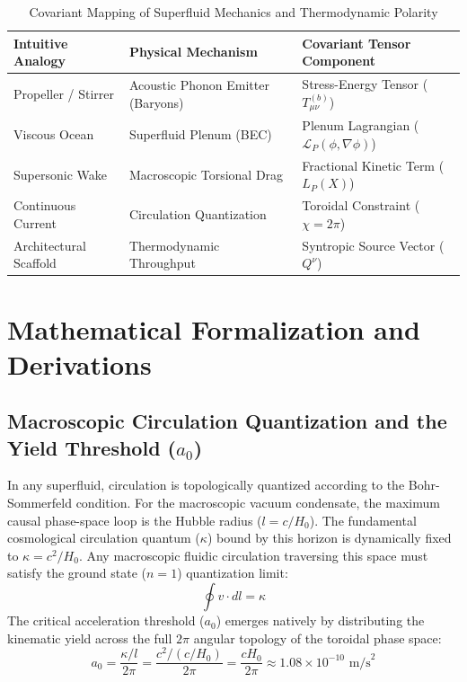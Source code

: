 \documentclass[aps,prd,10pt,twocolumn,superscriptaddress,nofootinbib]{revtex4-2}
\begin{document}
\begin{table}[htbp]
\centering
\caption{\footnotesize Covariant Mapping of Superfluid Mechanics and Thermodynamic Polarity}
\label{tab:covariant}
\begin{tabular}{lll}
\toprule
\textbf{Intuitive Analogy} & \textbf{Physical Mechanism} & \textbf{Covariant Tensor Component} \\
\midrule
Propeller / Stirrer & Acoustic Phonon Emitter (Baryons) & Stress-Energy Tensor ($T_{\mu\nu}^{(b)}$) \\
Viscous Ocean & Superfluid Plenum (BEC) & Plenum Lagrangian ($\mathcal{L}_P(\phi,\nabla\phi)$) \\
Supersonic Wake & Macroscopic Torsional Drag & Fractional Kinetic Term ($L_P(X)$) \\
Continuous Current & Circulation Quantization & Toroidal Constraint ($\chi=2\pi$) \\
Architectural Scaffold & Thermodynamic Throughput & Syntropic Source Vector ($Q^\nu$) \\
\bottomrule
\end{tabular}
\end{table}

\section{\label{sec:math}Mathematical Formalization and Derivations}

\subsection{Macroscopic Circulation Quantization and the Yield Threshold (\texorpdfstring{$a_0$}{a0})}
In any superfluid, circulation is topologically quantized according to the Bohr-Sommerfeld condition. For the macroscopic vacuum condensate, the maximum causal phase-space loop is the Hubble radius ($l = c/H_0$). The fundamental cosmological circulation quantum ($\kappa$) bound by this horizon is dynamically fixed to $\kappa = c^2/H_0$. Any macroscopic fluidic circulation traversing this space must satisfy the ground state ($n=1$) quantization limit:
\begin{equation}
\oint v \cdot dl = \kappa
\end{equation}
The critical acceleration threshold ($a_0$) emerges natively by distributing the kinematic yield across the full $2\pi$ angular topology of the toroidal phase space:
\begin{equation}
a_0 = \frac{\kappa / l}{2\pi} = \frac{c^2 / (c/H_0)}{2\pi} = \frac{c H_0}{2\pi} \approx 1.08 \times 10^{-10} \text{ m/s}^2
\end{equation}
\end{document}
